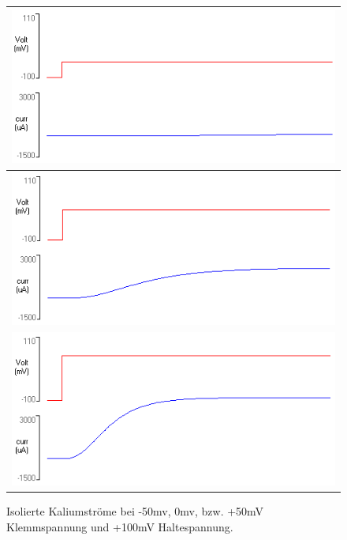 \documentclass[a4paper]{article}
\begin{document}
\begin{figure}[H]
    \centering
    \begin{tabular}{|c|}
        \hline
         \includegraphics{images/Aufgabe3_4-ClampMinus50-TTX_Graph.png} \\
         \hline
         \includegraphics{images/Aufgabe3_4-Clamp0-TTX_Graph.png}\\
         \hline
         \includegraphics{images/Aufgabe3_4-Clamp50-TTX_Graph.png}\\
         \hline
    \end{tabular}
    \caption{Isolierte Kaliumströme bei -50mv, 0mv, bzw. +50mV Klemmspannung und +100mV Haltespannung.}
    \label{fig:A3_4b}
\end{figure}
\end{document}
